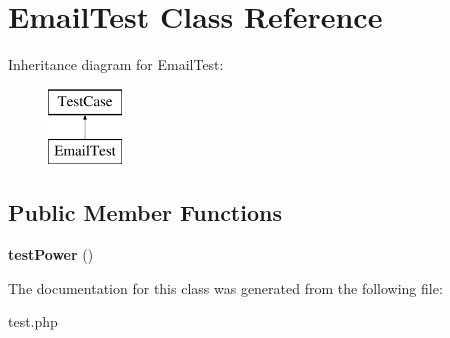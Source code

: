 \hypertarget{class_email_test}{}\section{Email\+Test Class Reference}
\label{class_email_test}
Inheritance diagram for Email\+Test\+:\begin{figure}[H]
\begin{center}
\leavevmode
\includegraphics[height=2.000000cm]{class_email_test}
\end{center}
\end{figure}
\subsection*{Public Member Functions}
\begin{DoxyCompactItemize}
\item 
\mbox{\label{class_email_test_a591d95d74a56bc17b0a4d132f845de66}} 
{\bfseries test\+Power} ()
\end{DoxyCompactItemize}


The documentation for this class was generated from the following file\+:\begin{DoxyCompactItemize}
\item 
test.\+php\end{DoxyCompactItemize}
